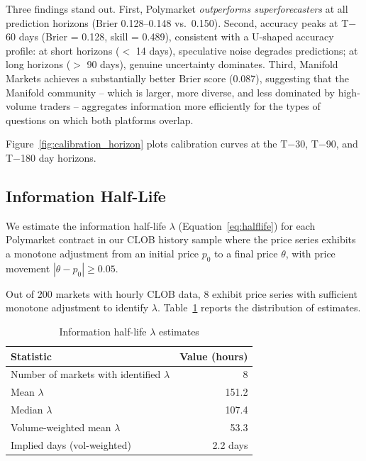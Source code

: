 \documentclass[12pt,a4paper]{article}
\theoremstyle{definition}
\theoremstyle{remark}
\begin{document}
Three findings stand out.
First, Polymarket \emph{outperforms superforecasters} at all prediction horizons
(Brier 0.128--0.148 vs.\ 0.150).
Second, accuracy peaks at T$-$60 days (Brier = 0.128, skill = 0.489), consistent
with a U-shaped accuracy profile: at short horizons ($<$ 14 days), speculative noise
degrades predictions; at long horizons ($>$ 90 days), genuine uncertainty dominates.
Third, Manifold Markets achieves a substantially better Brier score (0.087),
suggesting that the Manifold community -- which is larger, more diverse,
and less dominated by high-volume traders -- aggregates information more
efficiently for the types of questions on which both platforms overlap.

Figure~\ref{fig:calibration_horizon} plots calibration curves at the
T$-$30, T$-$90, and T$-$180 day horizons.

\subsection{Information Half-Life}
\label{sec:halflife_results}

We estimate the information half-life $\lambda$ (Equation~\ref{eq:halflife})
for each Polymarket contract in our CLOB history sample where the price
series exhibits a monotone adjustment from an initial price $p_0$ to a
final price $\theta$, with price movement $|\theta - p_0| \geq 0.05$.

Out of 200 markets with hourly CLOB data, 8 exhibit price series with
sufficient monotone adjustment to identify $\lambda$.
Table~\ref{tab:halflife} reports the distribution of estimates.

\begin{table}[H]
\centering
\caption{Information half-life $\lambda$ estimates}
\label{tab:halflife}
\begin{tabular}{lr}
\toprule
\textbf{Statistic} & \textbf{Value (hours)} \\
\midrule
Number of markets with identified $\lambda$ & 8 \\
Mean $\lambda$                              & 151.2 \\
Median $\lambda$                            & 107.4 \\
Volume-weighted mean $\lambda$              & 53.3 \\
\midrule
Implied days (vol-weighted)                 & 2.2 days \\
\bottomrule
\end{tabular}
\end{table}
\end{document}
